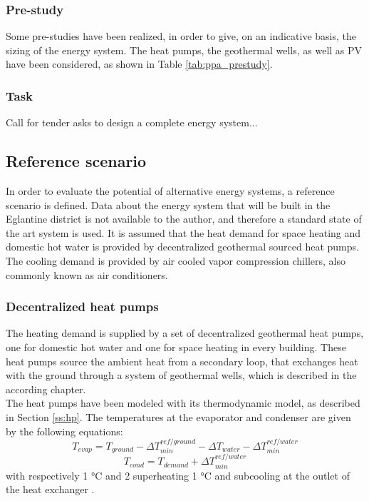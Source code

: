 \documentclass{article}
\begin{document}

\subsubsection{Pre-study}
Some pre-studies have been realized, in order to give, on an indicative basis, the sizing of the energy system. The heat pumps, the geothermal wells, as well as PV have been considered, as shown in Table \ref{tab:ppa_prestudy}.


\subsubsection{Task}
Call for tender asks to design a complete energy system... 


\subsection{Reference scenario}
In order to evaluate the potential of alternative energy systems, a reference scenario is defined. Data about the energy system that will be built in the Eglantine district is not available to the author, and therefore a standard state of the art system is used. It is assumed that the heat demand for space heating and domestic hot water is provided by decentralized geothermal sourced heat pumps. The cooling demand is provided by air cooled vapor compression chillers, also commonly known as air conditioners.

\subsubsection{Decentralized heat pumps}
The heating demand is supplied by a set of decentralized geothermal heat pumps, one for domestic hot water and one for space heating in every building. These heat pumps source the ambient heat from a secondary loop, that exchanges heat with the ground through a system of geothermal wells, which is described in the according chapter. \\
The heat pumps have been modeled with its thermodynamic model, as described in Section \ref{ss:hp}.
The temperatures at the evaporator and condenser are given by the following equations:
\begin{equation}
    T_{evap} = T_{ground} - \Delta T_{min}^{ref/ground} - \Delta T_{water} - \Delta T_{min}^{ref/water}
\end{equation}
\begin{equation}
    T_{cond} = T_{demand} + \Delta T_{min}^{ref/water}
\end{equation}
with respectively 1 \si{\celsius} and 2 superheating 1 \si{\celsius} and subcooling at the outlet of the heat exchanger \cite{}.
\end{document}
